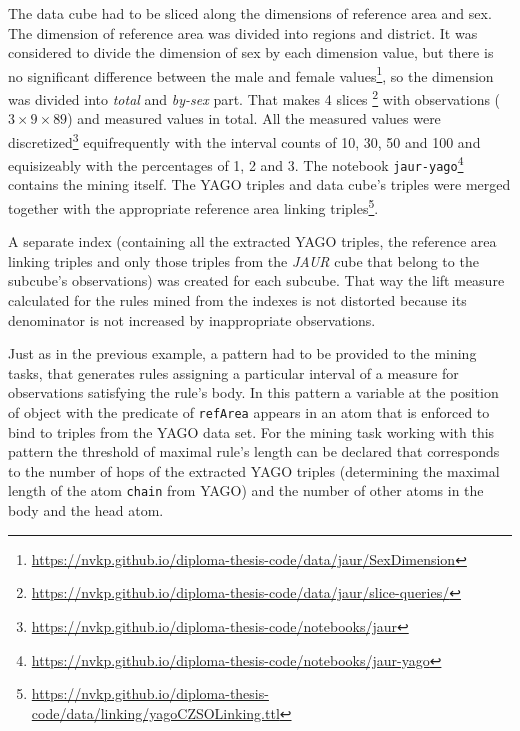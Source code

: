 The data cube had to be sliced along the dimensions of reference area and sex. The dimension of reference area was divided into regions and district. It was considered to divide the dimension of sex by each dimension value, but there is no significant difference between the male and female values\footnote{\href{https://nvkp.github.io/diploma-thesis-code/data/jaur/SexDimension}{https://nvkp.github.io/diploma-thesis-code/data/jaur/SexDimension}}, so the dimension was divided into \textit{total} and \textit{by-sex} part. That makes 4 slices \footnote{\href{https://nvkp.github.io/diploma-thesis-code/data/jaur/slice-queries/}{https://nvkp.github.io/diploma-thesis-code/data/jaur/slice-queries/}} with  observations ($3 \times 9 \times 89$) and  measured values in total. All the measured values were discretized\footnote{\href{https://nvkp.github.io/diploma-thesis-code/notebooks/jaur}{https://nvkp.github.io/diploma-thesis-code/notebooks/jaur}} equifrequently with the interval counts of 10, 30, 50 and 100 and equisizeably with the percentages of 1, 2 and 3. The notebook \verb|jaur-yago|\footnote{\href{https://nvkp.github.io/diploma-thesis-code/notebooks/jaur-yago}{https://nvkp.github.io/diploma-thesis-code/notebooks/jaur-yago}} contains the mining itself. The YAGO triples and data cube's triples were merged together with the appropriate reference area linking triples\footnote{\href{https://nvkp.github.io/diploma-thesis-code/data/linking/yagoCZSOLinking.ttl}{https://nvkp.github.io/diploma-thesis-code/data/linking/yagoCZSOLinking.ttl}}.

A separate index (containing all the extracted YAGO triples, the reference area linking triples and only those triples from the \textit{JAUR} cube that belong to the subcube's observations) was created for each subcube. That way the lift measure calculated for the rules mined from the indexes is not distorted because its denominator is not increased by inappropriate observations.

Just as in the previous example, a pattern had to be provided to the mining tasks, that generates rules assigning a particular interval of a measure for observations satisfying the rule's body. In this pattern a variable at the position of object with the predicate of \verb|refArea| appears in an atom that is enforced to bind to triples from the YAGO data set. For the mining task working with this pattern the threshold of maximal rule's length can be declared that corresponds to the number of hops of the extracted YAGO triples (determining the maximal length of the atom \verb|chain| from YAGO) and the number of other atoms in the body and the head atom.

